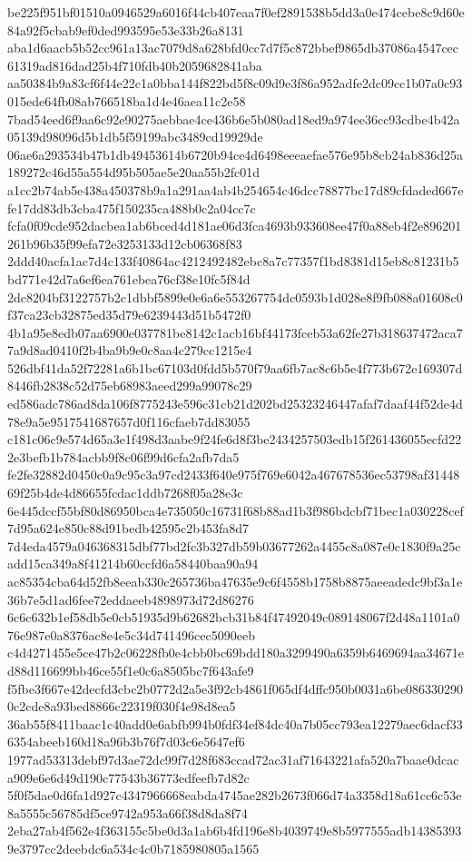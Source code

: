 \documentclass[11pt,a4paper]{article}
\begin{document}
{be225f951bf01510a0946529a6016f44cb407eaa7f0ef2891538b5dd3a0e474cebe8c9d60e84a92f5cbab9ef0ded993595e53e33b26a8131
aba1d6aacb5b52cc961a13ac7079d8a628bfd0cc7d7f5c872bbef9865db37086a4547cec61319ad816dad25b4f710fdb40b2059682841aba
aa50384b9a83cf6f44e22c1a0bba144f822bd5f8c09d9e3f86a952adfe2dc09cc1b07a0c93015ede64fb08ab766518ba1d4e46aea11c2e58
7bad54eed6f9aa6c92e90275aebbae4ce436b6e5b080ad18ed9a974ee36cc93cdbe4b42a05139d98096d5b1db5f59199abc3489cd19929de
06ae6a293534b47b1db49453614b6720b94ce4d6498eeeaefae576e95b8cb24ab836d25a189272c46d55a554d95b505ae5e20aa55b2fc01d
a1cc2b74ab5e438a450378b9a1a291aa4ab4b254654c46dcc78877bc17d89cfdaded667efe17dd83db3cba475f150235ca488b0c2a04cc7c
fcfa0f09cde952dacbea1ab6bced4d181ae06d3fca4693b933608ee47f0a88eb4f2e896201261b96b35f99efa72e3253133d12cb06368f83
2ddd40acfa1ac7d4c133f40864ac4212492482ebc8a7c77357f1bd8381d15eb8c81231b5bd771e42d7a6ef6ea761ebea76cf38e10fc5f84d
2dc8204bf3122757b2c1dbbf5899e0e6a6e553267754dc0593b1d028e8f9fb088a01608c0f37ca23cb32875ed35d79e6239443d51b5472f0
4b1a95e8edb07aa6900e037781be8142c1acb16bf44173fceb53a62fe27b318637472aca77a9d8ad0410f2b4ba9b9e0c8aa4c279cc1215e4
526dbf41da52f72281a6b1bc67103d0fdd5b570f79aa6fb7ac8c6b5e4f773b672e169307d8446fb2838c52d75eb68983aeed299a99078c29
ed586adc786ad8da106f8775243e596c31cb21d202bd25323246447afaf7daaf44f52de4d78e9a5e9517541687657d0f116cfaeb7dd83055
c181c06c9e574d65a3e1f498d3aabe9f24fe6d8f3be2434257503edb15f261436055ecfd222e3befb1b784acbb9f8c06f99d6cfa2afb7da5
fe2fe32882d0450c0a9c95c3a97cd2433f640e975f769e6042a467678536ec53798af3144869f25b4de4d86655fcdac1ddb7268f05a28e3c
6e445dccf55bf80d86950bca4e735050c16731f68b88ad1b3f986bdcbf71bec1a030228cef7d95a624e850c88d91bedb42595c2b453fa8d7
7d4eda4579a046368315dbf77bd2fc3b327db59b03677262a4455c8a087e0c1830f9a25cadd15ca349a8f41214b60ccfd6a58440baa90a94
ac85354cba64d52fb8eeab330c265736ba47635e9c6f4558b1758b8875aeeadedc9bf3a1e36b7e5d1ad6fee72eddaeeb4898973d72d86276
6c6c632b1ef58db5e0cb51935d9b62682bcb31b84f47492049c089148067f2d48a1101a076e987e0a8376ac8e4e5c34d741496cec5090eeb
c4d4271455e5ce47b2c06228fb0e4cbb0bc69bdd180a3299490a6359b6469694aa34671ed88d116699bb46ce55f1e0c6a8505bc7f643afe9
f5fbe3f667e42decfd3cbc2b0772d2a5e3f92cb4861f065df4dffc950b0031a6be0863302900c2cde8a93bed8866c22319f030f4e98d8ea5
36ab55f8411baac1c40add0e6abfb994b0fdf34ef84dc40a7b05cc793ea12279aec6dacf336354abeeb160d18a96b3b76f7d03c6e5647ef6
1977ad53313debf97d3ae72dc99f7d28f683ccad72ac31af71643221afa520a7baae0dcaca909e6e6d49d190c77543b36773edfeefb7d82c
5f0f5dae0d6fa1d927c4347966668eabda4745ae282b2673f066d74a3358d18a61cc6c53e8a5555c56785df5ce9742a953a66f38d8da8f74
2eba27ab4f562e4f363155c5be0d3a1ab6b4fd196e8b4039749e8b5977555adb143853939e3797cc2deebdc6a534c4c0b7185980805a1565
}
\end{document}
